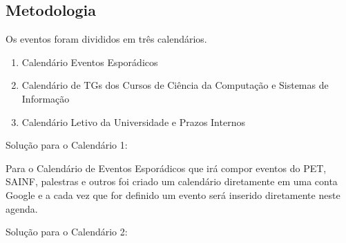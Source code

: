 \subsection{Metodologia}

Os eventos foram divididos em três calendários. 
\begin{enumerate}
\item Calendário Eventos Esporádicos
\item Calendário de TGs dos Cursos de Ciência da Computação e Sistemas de Informação
\item Calendário Letivo da Universidade e Prazos Internos
\end{enumerate}

Solução para o Calendário 1:

Para o Calendário de Eventos Esporádicos que irá compor eventos do PET, SAINF, palestras e outros foi criado um calendário diretamente em uma conta Google e a cada vez que for definido um evento será inserido diretamente neste agenda.

Solução para o Calendário 2:

